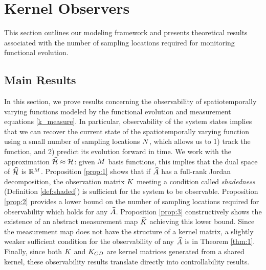 \vspace{-0.1in}
\section{Kernel Observers}\label{sec:observers}

This section outlines our modeling framework and presents theoretical results associated with the number of sampling locations required for monitoring functional evolution. 




\subsection{Main Results}\label{sec:theory_results}

In this section, we prove results concerning the observability of spatiotemporally varying functions modeled by the functional evolution and measurement equations \eqref{k_measure}. In particular,  observability of the system states implies that we can recover the current state of the spatiotemporally varying function using a small number of sampling locations $N$, which allows us to 1) track the function, and 2) predict its evolution forward in time. We work with the approximation $\widehat{\mathcal{H}}\approx\mathcal{H}$: given $M$ basis functions, this implies that the dual space of $\widehat{\mathcal{H}}$ is $\mathbb{R}^{M}$.
Proposition \ref{prop:1} shows that if $\widehat{A}$ has a full-rank Jordan decomposition, the observation matrix $K$ meeting a condition called \emph{shadedness} (Definition \ref{def:shaded}) is sufficient for the system to be observable. Proposition \ref{prop:2} provides a lower bound on the number of sampling locations required for observability which holds for any $\widehat{A}$.  Proposition \ref{prop:3} constructively shows the existence of an abstract measurement map $\widetilde{K}$ achieving this lower bound. Since the measurement map does not have the structure of a kernel matrix, a slightly weaker sufficient condition for the observability of any $\widehat{A}$ is in Theorem \ref{thm:1}. Finally, since both $K$ and $K_{CD}$ are kernel matrices generated from a shared kernel, these observability results translate directly into controllability results.

